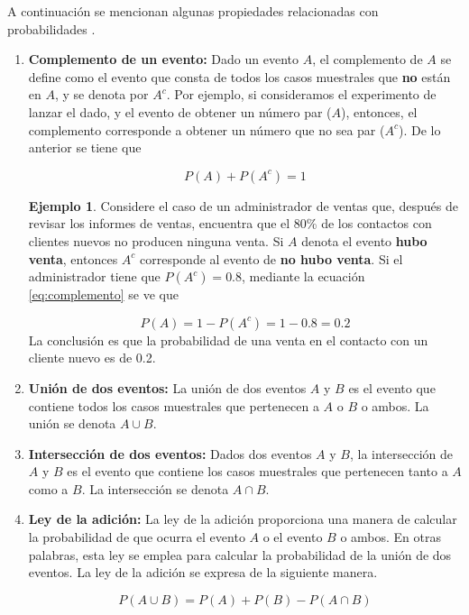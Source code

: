 \documentclass[
  11pt,
]{book}
\theoremstyle{definition}
\theoremstyle{definition}
\newtheorem{example}{Ejemplo}[chapter]
\theoremstyle{definition}
\theoremstyle{definition}
\theoremstyle{remark}
\begin{document}
A continuación se mencionan algunas propiedades relacionadas con probabilidades \citep[página 157]{anderson}.

\begin{enumerate}
\def\labelenumi{\arabic{enumi}.}
\item
  \textbf{Complemento de un evento:} Dado un evento \(A\), el complemento de \(A\) se define como el evento que consta de todos los casos muestrales que \textbf{no} están en \(A\), y se denota por \(A^c\). Por ejemplo, si consideramos el experimento de lanzar el dado, y el evento de obtener un número par (\(A\)), entonces, el complemento corresponde a obtener un número que no sea par (\(A^c\)). De lo anterior se tiene que

  \begin{equation}
  P(A) + P(A^c) = 1
  \label{eq:complemento}
  \end{equation}

  \begin{example}
  Considere el caso de un administrador de ventas que, después de revisar los informes de ventas, encuentra que el 80\% de los contactos con clientes nuevos no producen ninguna venta. Si \(A\) denota el evento \textbf{hubo venta}, entonces \(A^c\) corresponde al evento de \textbf{no hubo venta}. Si el administrador tiene que \(P(A^c) = 0.8\), mediante la ecuación \eqref{eq:complemento} se ve que

  \[P(A) = 1 - P(A^c) = 1 - 0.8 = 0.2\]
  La conclusión es que la probabilidad de una venta en el contacto con un cliente nuevo es de 0.2.
  \end{example}
\item
  \textbf{Unión de dos eventos:} La unión de dos eventos \(A\) y \(B\) es el evento que contiene todos los casos muestrales que pertenecen a \(A\) o \(B\) o ambos. La unión se denota \(A \cup B\).
\item
  \textbf{Intersección de dos eventos:} Dados dos eventos \(A\) y \(B\), la intersección de \(A\) y \(B\) es el evento que contiene los casos muestrales que pertenecen tanto a \(A\) como a \(B\). La intersección se denota \(A \cap B\).
\item
  \textbf{Ley de la adición:} La ley de la adición proporciona una manera de calcular la probabilidad de que ocurra el evento \(A\) o el evento \(B\) o ambos. En otras palabras, esta ley se emplea para calcular la probabilidad de la unión de dos eventos. La ley de la adición se expresa de la siguiente manera.

  \begin{equation}
  P(A\cup B) = P(A) + P(B) - P(A\cap B)
  \label{eq:leyadicion}
  \end{equation}


\end{enumerate}
\end{document}
